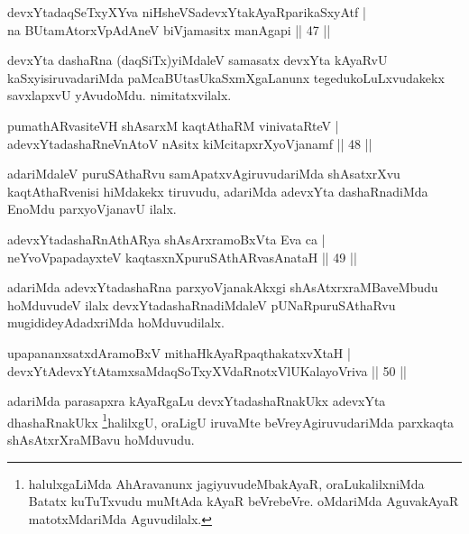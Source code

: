 
\begin{shl}
devxYtadaqSeTxyXYva niHsheVSadevxYtakAyaRparikaSxyAtf |\\
na BUtamAtorxVpAdAneV biVjamasitx manAgapi \hfill || 47 ||
\end{shl}

\begin{artha}
devxYta dashaRna (daqSiTx)yiMdaleV samasatx devxYta kAyaRvU kaSxyisiruvadariMda paMcaBUtasUkaSxmXgaLanunx tegedukoLuLxvudakekx savxlapxvU yAvudoMdu. nimitatxvilalx.
\end{artha}

\begin{shl}
pumathARvasiteVH shAsarxM kaqtAthaRM vinivataRteV |\\
adevxYtadashaRneVnAtoV nAsitx kiMcitapxrXyoVjanamf \hfill || 48 ||
\end{shl}

\begin{artha}
adariMdaleV puruSAthaRvu samApatxvAgiruvudariMda shAsatxrXvu kaqtAthaRvenisi hiMdakekx tiruvudu, adariMda adevxYta dashaRnadiMda EnoMdu parxyoVjanavU ilalx.
\end{artha}

\begin{shl}
adevxYtadashaRnAthARya shAsArxramoBxV\s ta Eva ca |\\
neYvoVpapadayxteV kaqtasxnXpuruSAthARvasAnataH \hfill || 49 ||
\end{shl}

\begin{artha}
adariMda adevxYtadashaRna parxyoVjanakAkxgi shAsAtxrxraMBaveMbudu hoMduvudeV ilalx devxYtadashaRnadiMdaleV pUNaRpuruSAthaRvu mugidideyAdadxriMda hoMduvudilalx.
\end{artha}


\begin{shl}
upapananxsatxdAramoBxV mithaHkAyaRpaqthakatxvXtaH |\\
devxYtAdevxYtAtamxsaMdaqSoTxyXVdaRnotxVlUKalayoVriva \hfill || 50 ||
\end{shl}

\begin{artha}
adariMda parasapxra kAyaRgaLu devxYtadashaRnakUkx adevxYta dhashaRnakUkx  
\footnote{halulxgaLiMda AhAravanunx jagiyuvudeMbakAyaR, oraLukalilxniMda Batatx kuTuTxvudu muMtAda kAyaR beVrebeVre. oMdariMda AguvakAyaR matotxMdariMda Aguvudilalx.}halilxgU, oraLigU iruvaMte beVreyAgiruvudariMda parxkaqta shAsAtxrXraMBavu hoMduvudu.
\end{artha}

